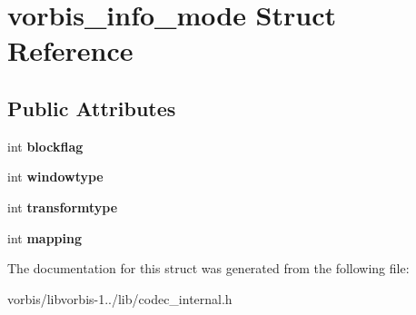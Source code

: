 \hypertarget{structvorbis__info__mode}{\section{vorbis\+\_\+info\+\_\+mode Struct Reference}
\label{structvorbis__info__mode}
}
\subsection*{Public Attributes}
\begin{DoxyCompactItemize}
\item 
\hypertarget{structvorbis__info__mode_acbc199dd5fcab1ee31d3d5832e3a0c09}{int {\bfseries blockflag}}\label{structvorbis__info__mode_acbc199dd5fcab1ee31d3d5832e3a0c09}

\item 
\hypertarget{structvorbis__info__mode_a32132c50e4b3e8c4c0715894f8380502}{int {\bfseries windowtype}}\label{structvorbis__info__mode_a32132c50e4b3e8c4c0715894f8380502}

\item 
\hypertarget{structvorbis__info__mode_a2f9fcbf43679f83f8fc9a5c6ade085ef}{int {\bfseries transformtype}}\label{structvorbis__info__mode_a2f9fcbf43679f83f8fc9a5c6ade085ef}

\item 
\hypertarget{structvorbis__info__mode_a902c7f0a9aef3856261a62797d504fff}{int {\bfseries mapping}}\label{structvorbis__info__mode_a902c7f0a9aef3856261a62797d504fff}

\end{DoxyCompactItemize}


The documentation for this struct was generated from the following file\+:\begin{DoxyCompactItemize}
\item 
vorbis/libvorbis-\/1../lib/codec\+\_\+internal.\+h\end{DoxyCompactItemize}

